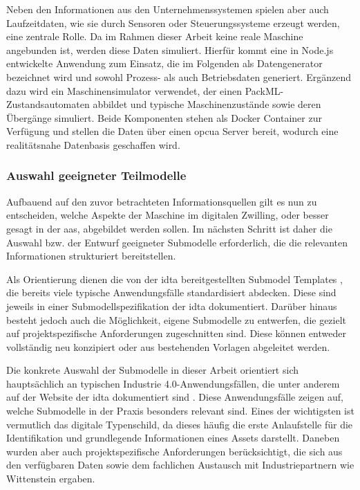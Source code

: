 Neben den Informationen aus den Unternehmenssystemen spielen aber auch Laufzeitdaten, wie sie durch Sensoren oder Steuerungssysteme erzeugt werden, eine zentrale Rolle.
Da im Rahmen dieser Arbeit keine reale Maschine angebunden ist, werden diese Daten simuliert.
Hierfür kommt eine in Node.js entwickelte Anwendung zum Einsatz, die im Folgenden als Datengenerator bezeichnet wird und sowohl Prozess- als auch Betriebsdaten generiert. 
Ergänzend dazu wird ein Maschinensimulator verwendet, der einen PackML-Zustandsautomaten abbildet und typische Maschinenzustände sowie deren Übergänge simuliert. 
Beide Komponenten stehen als Docker Container zur Verfügung und stellen die Daten über einen \acs{opcua} Server bereit, wodurch eine realitätsnahe Datenbasis geschaffen wird.
\subsubsection{Auswahl geeigneter Teilmodelle}
Aufbauend auf den zuvor betrachteten Informationsquellen gilt es nun zu entscheiden, welche Aspekte der Maschine im digitalen Zwilling, oder besser gesagt in der \acs{aas}, abgebildet werden sollen.
Im nächsten Schritt ist daher die Auswahl bzw. der Entwurf geeigneter Submodelle erforderlich, die die relevanten Informationen strukturiert bereitstellen.

Als Orientierung dienen die von der \acs{idta} bereitgestellten Submodel Templates \cite{idtaTemplates}, die bereits viele typische Anwendungsfälle standardisiert abdecken.
Diese sind jeweils in einer Submodellspezifikation der \acs{idta} dokumentiert.
Darüber hinaus besteht jedoch auch die Möglichkeit, eigene Submodelle zu entwerfen, die gezielt auf projektspezifische Anforderungen zugeschnitten sind.
Diese können entweder vollständig neu konzipiert oder aus bestehenden Vorlagen abgeleitet werden.

Die konkrete Auswahl der Submodelle in dieser Arbeit orientiert sich hauptsächlich an typischen Industrie 4.0-Anwendungsfällen, die unter anderem auf der Website der \acs{idta} dokumentiert sind \cite{idtaUseCases}.
Diese Anwendungsfälle zeigen auf, welche Submodelle in der Praxis besonders relevant sind.
Eines der wichtigsten ist vermutlich das digitale Typenschild, da dieses häufig die erste Anlaufstelle für die Identifikation und grundlegende Informationen eines Assets darstellt.
Daneben wurden aber auch projektspezifische Anforderungen berücksichtigt, die sich aus den verfügbaren Daten sowie dem fachlichen Austausch mit Industriepartnern wie Wittenstein ergaben.

